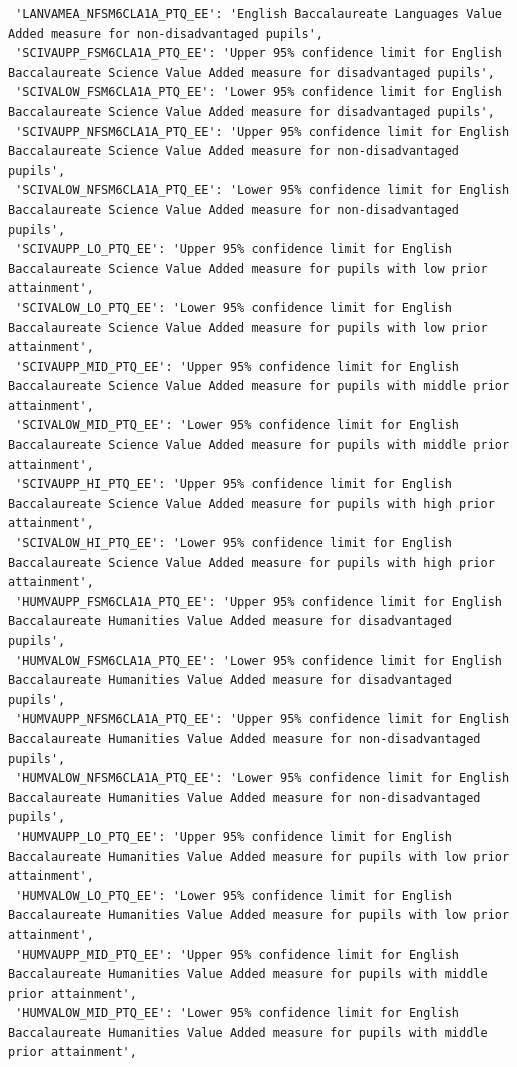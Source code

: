 \documentclass[
  letterpaper,
  DIV=11,
  numbers=noendperiod]{scrartcl}
\begin{document}
\begin{verbatim}
 'LANVAMEA_NFSM6CLA1A_PTQ_EE': 'English Baccalaureate Languages Value Added measure for non-disadvantaged pupils',
 'SCIVAUPP_FSM6CLA1A_PTQ_EE': 'Upper 95% confidence limit for English Baccalaureate Science Value Added measure for disadvantaged pupils',
 'SCIVALOW_FSM6CLA1A_PTQ_EE': 'Lower 95% confidence limit for English Baccalaureate Science Value Added measure for disadvantaged pupils',
 'SCIVAUPP_NFSM6CLA1A_PTQ_EE': 'Upper 95% confidence limit for English Baccalaureate Science Value Added measure for non-disadvantaged pupils',
 'SCIVALOW_NFSM6CLA1A_PTQ_EE': 'Lower 95% confidence limit for English Baccalaureate Science Value Added measure for non-disadvantaged pupils',
 'SCIVAUPP_LO_PTQ_EE': 'Upper 95% confidence limit for English Baccalaureate Science Value Added measure for pupils with low prior attainment',
 'SCIVALOW_LO_PTQ_EE': 'Lower 95% confidence limit for English Baccalaureate Science Value Added measure for pupils with low prior attainment',
 'SCIVAUPP_MID_PTQ_EE': 'Upper 95% confidence limit for English Baccalaureate Science Value Added measure for pupils with middle prior attainment',
 'SCIVALOW_MID_PTQ_EE': 'Lower 95% confidence limit for English Baccalaureate Science Value Added measure for pupils with middle prior attainment',
 'SCIVAUPP_HI_PTQ_EE': 'Upper 95% confidence limit for English Baccalaureate Science Value Added measure for pupils with high prior attainment',
 'SCIVALOW_HI_PTQ_EE': 'Lower 95% confidence limit for English Baccalaureate Science Value Added measure for pupils with high prior attainment',
 'HUMVAUPP_FSM6CLA1A_PTQ_EE': 'Upper 95% confidence limit for English Baccalaureate Humanities Value Added measure for disadvantaged pupils',
 'HUMVALOW_FSM6CLA1A_PTQ_EE': 'Lower 95% confidence limit for English Baccalaureate Humanities Value Added measure for disadvantaged pupils',
 'HUMVAUPP_NFSM6CLA1A_PTQ_EE': 'Upper 95% confidence limit for English Baccalaureate Humanities Value Added measure for non-disadvantaged pupils',
 'HUMVALOW_NFSM6CLA1A_PTQ_EE': 'Lower 95% confidence limit for English Baccalaureate Humanities Value Added measure for non-disadvantaged pupils',
 'HUMVAUPP_LO_PTQ_EE': 'Upper 95% confidence limit for English Baccalaureate Humanities Value Added measure for pupils with low prior attainment',
 'HUMVALOW_LO_PTQ_EE': 'Lower 95% confidence limit for English Baccalaureate Humanities Value Added measure for pupils with low prior attainment',
 'HUMVAUPP_MID_PTQ_EE': 'Upper 95% confidence limit for English Baccalaureate Humanities Value Added measure for pupils with middle prior attainment',
 'HUMVALOW_MID_PTQ_EE': 'Lower 95% confidence limit for English Baccalaureate Humanities Value Added measure for pupils with middle prior attainment',

\end{verbatim}
\end{document}
